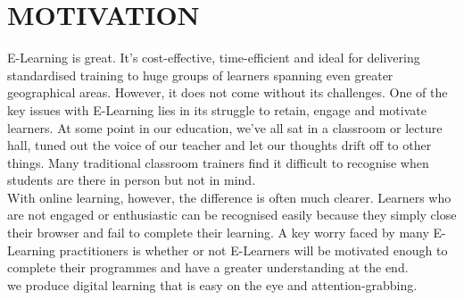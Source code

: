 \documentclass[oneside,a4paper,12pt]{report}
\begin{document}
{\section{MOTIVATION}
\hspace*{0.3in}E-Learning is great. It’s cost-effective, time-efficient and ideal for delivering standardised training to huge groups of learners spanning even greater geographical areas. However, it does not come without its challenges. One of the key issues with E-Learning lies in its struggle to retain, engage and motivate learners. At some point in our education, we’ve all sat in a classroom or lecture hall, tuned out the voice of our teacher and let our thoughts drift off to other things. Many traditional classroom trainers find it difficult to recognise when students are there in person but not in mind.\\
\hspace*{0.3in}With online learning, however, the difference is often much clearer. Learners who are not engaged or enthusiastic can be recognised easily because they simply close their browser and fail to complete their learning. A key worry faced by many E-Learning practitioners is whether or not E-Learners will be motivated enough to complete their programmes and have a greater understanding at the end.
\\
we  produce digital learning that is easy on the eye and attention-grabbing.\\

\nextpage
}
\end{document}
